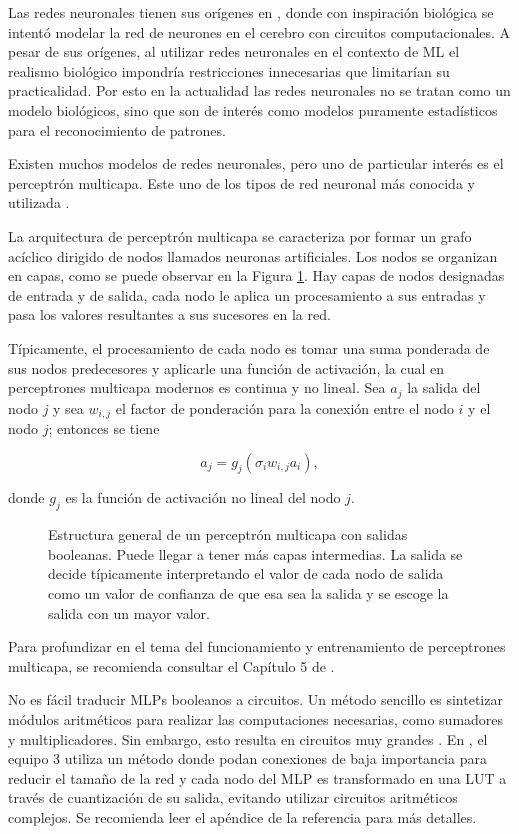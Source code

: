 Las redes neuronales tienen sus orígenes en \cite{mcculloch_logical_1943},
donde con inspiración biológica se intentó modelar la red de neurones en el
cerebro con circuitos computacionales. A pesar de sus orígenes, al utilizar
redes neuronales en el contexto de ML el realismo biológico impondría
restricciones innecesarias que limitarían su practicalidad. Por esto en la
actualidad las redes neuronales no se tratan como un modelo biológicos, sino
que son de interés como modelos puramente estadísticos para el reconocimiento
de patrones.

Existen muchos modelos de redes neuronales, pero uno de particular interés es
el perceptrón multicapa. Este uno de los tipos de red neuronal más conocida y
utilizada \cite{popescu_multilayer_2009}.

La arquitectura de perceptrón multicapa se caracteriza por formar un grafo
acíclico dirigido de nodos llamados neuronas artificiales. Los nodos se
organizan en capas, como se puede observar en la Figura \ref{fig:MLP}. Hay
capas de nodos designadas de entrada y de salida, cada nodo le aplica un
procesamiento a sus entradas y pasa los valores resultantes a sus sucesores en
la red.

Típicamente, el procesamiento de cada nodo es tomar una suma ponderada de sus
nodos predecesores y aplicarle una función de activación, la cual en
perceptrones multicapa modernos es continua y no lineal. Sea $a_j$ la salida
del nodo $j$ y sea $w_{i,j}$ el factor de ponderación para la conexión entre el
nodo $i$ y el nodo $j$; entonces se tiene

$$a_j = g_j\left(\sigma_i w_{i,j} a_i \right),$$

donde $g_j$ es la función de activación no lineal del nodo $j$.
\cite{russell2016artificial}

\begin{figure}[htb]
  \centering
  
  \caption{Estructura general de un perceptrón multicapa con salidas booleanas.
  Puede llegar a tener más capas intermedias. La salida se decide típicamente
  interpretando el valor de cada nodo de salida como un valor de confianza de
  que esa sea la salida y se escoge la salida con un mayor valor.}
  \label{fig:MLP}
\end{figure}

Para profundizar en el tema del funcionamiento y entrenamiento de perceptrones
multicapa, se recomienda consultar el Capítulo 5 de \cite{bishop_pattern_2006}.

No es fácil traducir MLPs booleanos a circuitos. Un método sencillo es
sintetizar módulos aritméticos para realizar las computaciones necesarias, como
sumadores y multiplicadores. Sin embargo, esto resulta en circuitos muy grandes
\cite{miyasaka_logic_2021}. En \cite{rai_logic_2021}, el equipo 3 utiliza un
método donde podan conexiones de baja importancia para reducir el tamaño de la
red y cada nodo del MLP es transformado en una LUT a través de cuantización de
su salida, evitando utilizar circuitos aritméticos complejos. Se recomienda
leer el apéndice de la referencia para más detalles.


